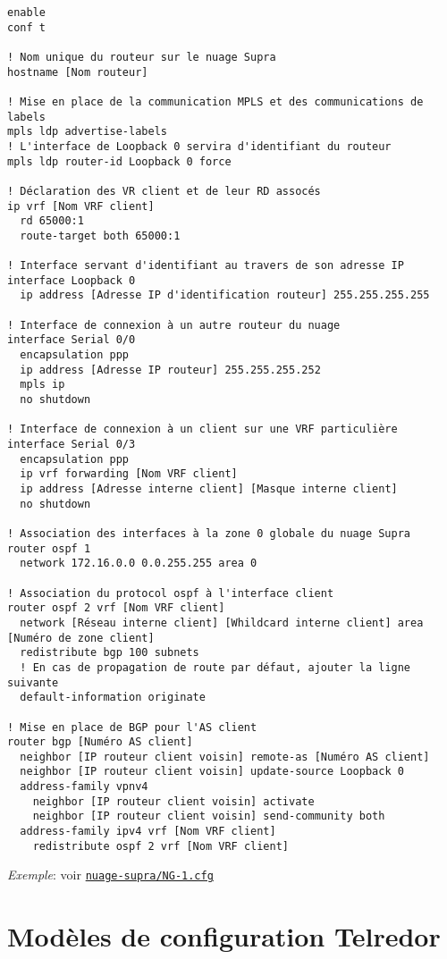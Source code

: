 \documentclass{article}
\newcommand{\tlr}{Telredor\xspace}
\newcommand{\seefile}[1]{
  \begin{center}
  \begin{minipage}{0.9\textwidth}
    \emph{Exemple}: voir \texttt{\href{https://github.com/EpicKiwi/Wide-Network-Project-Cesi-A4/blob/master/network/#1}{#1}}
  \end{minipage}
  \end{center}
}
\begin{document}
\begin{lstlisting}[caption=Modèle de configuration d'un routeur nuagique]
enable
conf t

! Nom unique du routeur sur le nuage Supra
hostname [Nom routeur]

! Mise en place de la communication MPLS et des communications de labels
mpls ldp advertise-labels
! L'interface de Loopback 0 servira d'identifiant du routeur
mpls ldp router-id Loopback 0 force

! Déclaration des VR client et de leur RD assocés
ip vrf [Nom VRF client]
  rd 65000:1
  route-target both 65000:1

! Interface servant d'identifiant au travers de son adresse IP
interface Loopback 0
  ip address [Adresse IP d'identification routeur] 255.255.255.255

! Interface de connexion à un autre routeur du nuage
interface Serial 0/0
  encapsulation ppp
  ip address [Adresse IP routeur] 255.255.255.252
  mpls ip
  no shutdown

! Interface de connexion à un client sur une VRF particulière
interface Serial 0/3
  encapsulation ppp
  ip vrf forwarding [Nom VRF client]
  ip address [Adresse interne client] [Masque interne client]
  no shutdown

! Association des interfaces à la zone 0 globale du nuage Supra
router ospf 1
  network 172.16.0.0 0.0.255.255 area 0

! Association du protocol ospf à l'interface client
router ospf 2 vrf [Nom VRF client]
  network [Réseau interne client] [Whildcard interne client] area [Numéro de zone client]
  redistribute bgp 100 subnets
  ! En cas de propagation de route par défaut, ajouter la ligne suivante
  default-information originate

! Mise en place de BGP pour l'AS client
router bgp [Numéro AS client]
  neighbor [IP routeur client voisin] remote-as [Numéro AS client]
  neighbor [IP routeur client voisin] update-source Loopback 0
  address-family vpnv4
    neighbor [IP routeur client voisin] activate
    neighbor [IP routeur client voisin] send-community both
  address-family ipv4 vrf [Nom VRF client]
    redistribute ospf 2 vrf [Nom VRF client]
\end{lstlisting}

\seefile{nuage-supra/NG-1.cfg}

\section{Modèles de configuration \tlr}
\end{document}

